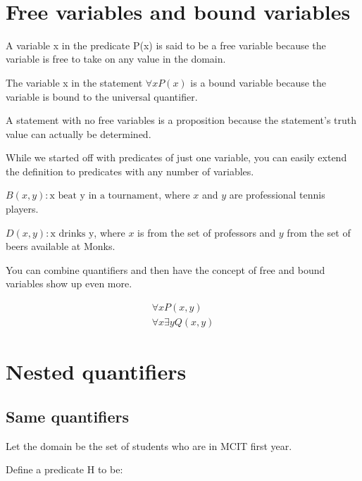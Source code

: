 \documentclass[12pt]{article}
\begin{document}
\begin{center}
\\
\vspace{1cm}
\end{center}

\vspace{0.5cm}\noindent

\section*{Free variables and bound variables}
A variable x in the predicate P(x) is said to be a free variable because the variable is free to take on any value in the domain. 

The variable x in the statement $\forall x P(x)$ is a bound variable because the variable is bound to the universal quantifier. 

A statement with no free variables is a proposition because the statement's truth value can actually be determined. 

While we started off with predicates of just one variable, you can easily extend the definition to predicates with any number of variables.

$B(x,y): \text{x beat y in a tournament}$, where $x$ and $y$ are professional tennis players.

$D(x,y): \text{x drinks y}$, where $x$ is from the set of professors and $y$ from the set of beers available at Monks.  

You can combine quantifiers and then have the concept of free and bound variables show up even more.

\begin{align*}
\forall x P(x,y) \tag{x is a bound variable, but y is free} \\
\forall x \exists y Q(x,y) \tag{x and y are both bound}
\end{align*}

\section*{Nested quantifiers}

\subsection*{Same quantifiers}

Let the domain be the set of students who are in MCIT first year.

Define a predicate H to be:
\end{document}
